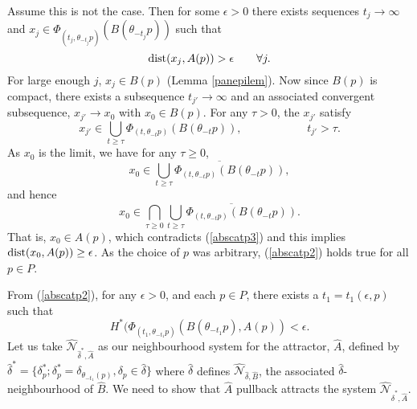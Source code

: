 \begin{prf}
  Assume this is not the case. Then for some $\epsilon > 0$ there exists
  sequences $t_j \to \infty$ and $x_j \in \Phi_{(t_j,
  \theta_{-t_j}p)} (B(\theta_{-t_j}p))$ such that
  \begin{equation}
  \label{abscatp3}
    {\rm dist}(x_j,A(p)) > \epsilon \qquad \forall j.
  \end{equation}
  For large enough $j$, $x_j \in B(p)$ (Lemma \ref{panepilem}). Now since
  $B(p)$ is compact, there exists a subsequence $t_{j'} \rightarrow
  \infty$ and an associated convergent subsequence, $x_{j'} \to x_0$ with
  $x_0 \in B(p)$. For any $\tau > 0$, the $x_{j'}$ satisfy
  \[ x_{j'} \in \bigcup_{t \geq \tau} \Phi_{(t,\theta_{-t}p)}
          (B(\theta_{-t}p)), \hspace{2cm} \quad t_{j'}>\tau. \]
  As $x_0$ is the limit, we have for any $\tau \geq 0$,
  \[ x_0 \in \overline{\bigcup_{t \geq \tau} \Phi_{(t,\theta_{-t}p)}
         (B(\theta_{-t}p))}, \]
  and hence
  \[ x_0 \in \bigcap_{\tau \geq 0} \overline{\bigcup_{t \geq \tau}
            \Phi_{(t,\theta_{-t}p)}(B(\theta_{-t}p))}. \]
That is, $x_0 \in A(p)$, which contradicts (\ref{abscatp3}) and this implies
${\rm dist}(x_0,A(p)) \geq \epsilon$. As the choice of $p$ was arbitrary, (\ref{abscatp2})
holds true for all $p \in   P$.

  From (\ref{abscatp2}), for any $\epsilon > 0$, and each $p \in P$, there
  exists a $t_1 = t_1(\epsilon,p)$ such that
  \[ H^*(\Phi_{(t_1,\theta_{-t_1}p)}
           (B(\theta_{-t_1}p),A(p)) < \epsilon. \]
  Let us take $\hat{\mathcal{N}}_{\hat{\delta}^*,\hat{A}}$ as our
  neighbourhood system for the attractor, $\hat{A}$, defined by
  $\hat{\delta}^* = \{ \delta^*_p; \delta^*_p =
  \delta_{\theta_{-t_1}(p)}, \delta_p \in \hat{\delta} \}$
  where $\hat{\delta}$ defines $\hat{\mathcal{N}}_{\hat{\delta}, \hat{B}}$,
  the associated $\hat{\delta}$-neighbourhood of $\hat{B}$. We need to show
  that $\hat{A}$ pullback attracts the system
  $\hat{\mathcal{N}}_{\hat{\delta}^*,\hat{A}}$.


\end{prf}
